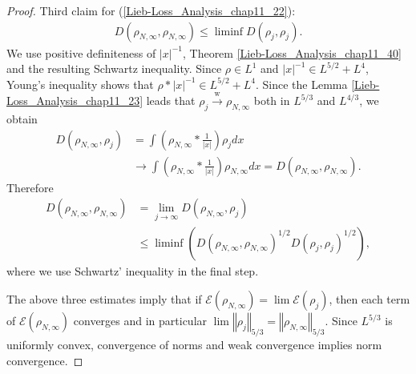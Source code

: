 \documentclass[openany, a4paper, oneside]{book}
\theoremstyle{break}
\theoremstyle{breakdefn}
\newcommand{\abs}[1]{\left|#1\right|}
\newcommand{\norm}[1]{\left\Vert#1\right\Vert}
\newcommand{\rbk}[1]{\left (#1\right)}
\newcommand{\calE}{\mathcal{E}}
\newcommand{\limjtoinfty}{\lim_{j \to \infty}}
\newcommand{\rhoNinfty}{\rho_{N, \infty}}
\newcommand{\wto}{\xrightarrow{\text{w}}}
\begin{document}
\begin{proof}
Third claim for (\ref{Lieb-Loss_Analysis_chap11_22}):
\begin{align}
 D (\rhoNinfty, \rhoNinfty)
 \leq
 \liminf D \rbk{\rho_j, \rho_j}.
\end{align}
We use positive definiteness of $\abs{x}^{-1}$, Theorem \ref{Lieb-Loss_Analysis_chap11_40} and the resulting Schwartz inequality.
Since $\rho \in L^1$ and $\abs{x}^{-1} \in L^{5/2} + L^4$, Young's inequality shows that $\rho * \abs{x}^{-1} \in L^{5/2} + L^4$.
Since the Lemma \ref{Lieb-Loss_Analysis_chap11_23} leads that $\rho_j \wto \rhoNinfty$ both in $L^{5/3}$ and $L^{4/3}$,
we obtain
\begin{align}
 D (\rhoNinfty, \rho_j)
 &=
 \int \rbk{\rhoNinfty * \frac{1}{\abs{x}}} \rho_j dx \\
 &\to
 \int \rbk{\rhoNinfty * \frac{1}{\abs{x}}} \rhoNinfty dx
 =
 D (\rhoNinfty, \rhoNinfty).
\end{align}
Therefore
\begin{align}
 D \rbk{\rhoNinfty, \rhoNinfty}
 &=
 \limjtoinfty D \rbk{\rhoNinfty, \rho_j} \\
 &\leq
 \liminf \rbk{D\rbk{\rhoNinfty, \rhoNinfty}^{1/2} D \rbk{\rho_j, \rho_j}^{1/2}},
\end{align}
where we use Schwartz' inequality in the final step.

The above three estimates imply that if $\calE (\rhoNinfty) = \lim \calE (\rho_j)$, then each term of $\calE (\rhoNinfty)$
converges and in particular $\lim \norm{\rho_j}_{5/3} = \norm{\rhoNinfty}_{5/3}$.
Since $L^{5/3}$ is uniformly convex, convergence of norms and weak convergence implies norm convergence.
\end{proof}
\end{document}
